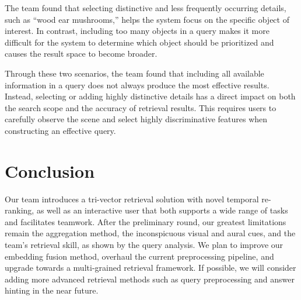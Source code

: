 \documentclass[11pt,a4paper]{article}
\begin{document}
The team found that selecting distinctive and less frequently occurring details, such as “wood ear mushrooms,” helps the system focus on the specific object of interest. In contrast, including too many objects in a query makes it more difficult for the system to determine which object should be prioritized and causes the result space to become broader.

Through these two scenarios, the team found that including all available information in a query does not always produce the most effective results. Instead, selecting or adding highly distinctive details has a direct impact on both the search scope and the accuracy of retrieval results. This requires users to carefully observe the scene and select highly discriminative features when constructing an effective query.

\section{Conclusion}

Our team introduces a tri-vector retrieval solution with novel temporal re-ranking, as well as an interactive user that both supports a wide range of tasks and facilitates teamwork. After the preliminary round, our greatest limitations remain the aggregation method, the inconspicuous visual and aural cues, and the team's retrieval skill, as shown by the query analysis. We plan to improve our embedding fusion method, overhaul the current preprocessing pipeline, and upgrade towards a multi-grained retrieval framework. If possible, we will consider adding more advanced retrieval methods such as query preprocessing and answer hinting in the near future.
\end{document}
